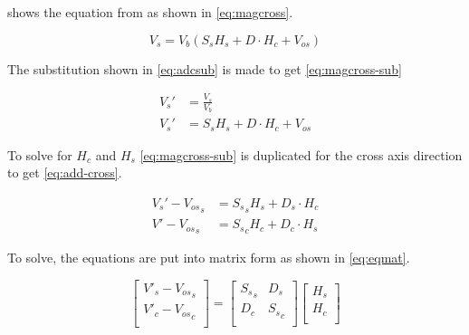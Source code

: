 

\label{ch:mag-deriv}

 shows the equation from \cite{AN215} as shown in \cref{eq:magcross}.

\begin{equation}
    V_s = V_b \left(S_s H_s + D \cdot H_c + V_{os} \right)
    \label{eq:magcross2}
\end{equation}

The substitution shown in \cref{eq:adcsub} is made to get \cref{eq:magcross-sub}

\begin{align}
    V_s' & =\frac{V_s}{V_b}\\
    V_s' & = S_s H_s + D \cdot H_c + V_{os}
    \label{eq:magcross-sub}
\end{align}

To solve for $H_c$ and $H_s$ \cref{eq:magcross-sub} is duplicated for the cross axis direction to get \cref{eq:add-cross}.

\begin{equation}
    \begin{aligned}
        V_s' - {V_{os}}_s &=  {S_s}_s H_s  + D_s \cdot H_c\\
        V' - {V_{os}}_s &=  {S_s}_c H_c  + D_c \cdot H_s
    \end{aligned}
    \label{eq:add-cross}
\end{equation}

To solve, the equations are put into matrix form as shown in \cref{eq:eqmat}.

\begin{equation}
    \begin{bmatrix}
        V'_s - {V_{os}}_s\\
        V'_c - {V_{os}}_c\\
    \end{bmatrix} =
    \begin{bmatrix}
        {S_s}_s & D_s \\
        D_c & {S_s}_c \\
    \end{bmatrix}
    \begin{bmatrix}
        H_s\\
        H_c\\
    \end{bmatrix}
    \label{eq:eqmat}
\end{equation}

